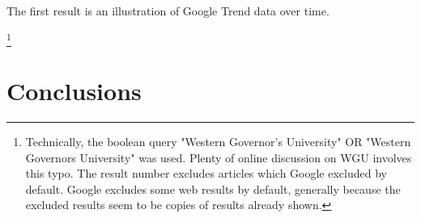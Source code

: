 \documentclass[review]{elsarticle}
\begin{document}
    The first result is an illustration of Google Trend data over time.
    

    \footnote{
        Technically, the boolean query "Western Governor's University" OR "Western Governors University" was used.
        Plenty of online discussion on WGU involves this typo.
        The result number excludes articles which Google excluded by default.
        Google excludes some web results by default, generally because the excluded results seem to be copies of results already shown.
    }


    
    \section{Conclusions}


    

    
\end{document}
